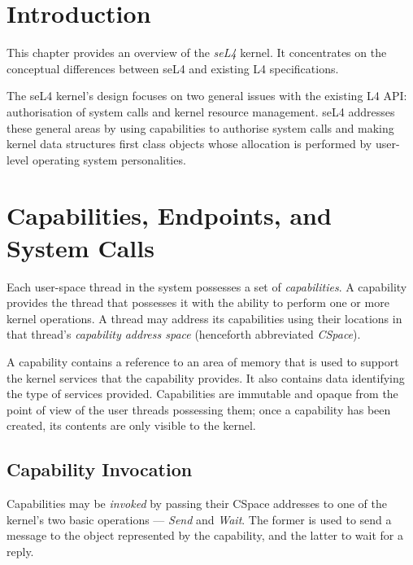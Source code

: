 %
%
%
%

\section{Introduction}\label{sec:overview.intro}

This chapter provides an overview of the \emph{seL4} kernel. It
concentrates on the conceptual differences between seL4 and existing
L4 specifications.

The seL4 kernel's design focuses on two general issues with the
existing L4 API: authorisation of system calls and kernel resource
management. seL4 addresses these general areas by using capabilities
to authorise system calls and making kernel data structures first
class objects whose allocation is performed by user-level operating
system personalities.

\section{Capabilities, Endpoints, and System Calls}\label{sec:overview.caps}

Each user-space thread in the system possesses a set of \emph{capabilities}. A
capability provides the thread that possesses it with the ability to perform one
or more kernel operations. A thread may address its capabilities using their
locations in that thread's \emph{capability address space} (henceforth
abbreviated \emph{CSpace}).

A capability contains a reference to an area of memory that is used to support
the kernel services that the capability provides. It also contains data
identifying the type of services provided. Capabilities are immutable and
opaque from the point of view of the user threads possessing them; once a
capability has been created, its contents are only visible to the kernel.

\subsection{Capability Invocation}

Capabilities may be \emph{invoked} by passing their CSpace addresses to one of
the kernel's two basic operations --- \emph{Send} and \emph{Wait}. The former
is used to send a message to the object represented by the capability, and the
latter to wait for a reply.

